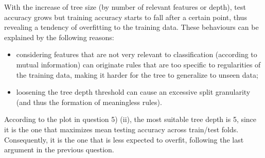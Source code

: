 \documentclass{exam}
\begin{document}
\begin{questions}
\begin{parts}
\begin{figure}[H]
            \end{figure}
        \end{parts}
        \item With the increase of tree size (by number of relevant features or depth), test accuracy grows but training accuracy starts to fall after a certain point, thus revealing a tendency of overfitting to the training data. These behaviours can be explained by the following reasons:
        \vspace{-0.5em}
        \begin{itemize}
            \item considering features that are not very relevant to classification (according to mutual information) can originate rules that are too specific to regularities of the training data, making it harder for the tree to generalize to unseen data;
            \item loosening the tree depth threshold  can cause an excessive split granularity (and thus the formation of meaningless rules).
        \end{itemize}
        \item According to the plot in question 5) (ii), the most suitable tree depth is 5, since it is the one that maximizes mean testing accuracy across train/test folds. Consequently, it is the one that is less expected to overfit, following the last argument in the previous question. 
    \end{questions}
    
\end{document}
